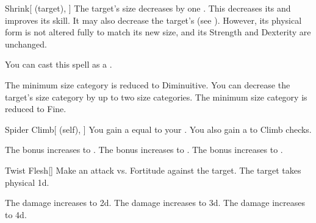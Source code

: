 \lowercase{\hypertarget{spell:Shrink}{}}\label{spell:Shrink}
\begin{attuneability}[Rank 1]{\hypertarget{spell:Shrink}{Shrink}}[ (target), ]
The target's size decreases by one .
This decreases its  and improves its  skill.
It may also decrease the target's  (see ).
However, its physical form is not altered fully to match its new size, and its Strength and Dexterity are unchanged.

You can cast this spell as a .

\rankline
{} The minimum size category is reduced to Diminuitive.
 You can decrease the target's size category by up to two size categories.
 The minimum size category is reduced to Fine.
\end{attuneability}
\vspace{0.25em}



\lowercase{\hypertarget{spell:Spider Climb}{}}\label{spell:Spider Climb}
\begin{attuneability}[Rank 1]{\hypertarget{spell:Spider Climb}{Spider Climb}}[ (self), ]
You gain a  equal to your .
You also gain a   to Climb checks.

\rankline
{} The bonus increases to .
 The bonus increases to .
 The bonus increases to .
\end{attuneability}
\vspace{0.25em}



\lowercase{\hypertarget{spell:Twist Flesh}{}}\label{spell:Twist Flesh}
\begin{freeability}[Rank 1]{\hypertarget{spell:Twist Flesh}{Twist Flesh}}[]
Make an attack vs. Fortitude against the target.
\hit The target takes physical  \plus1d.

\rankline
{} The damage increases to  \plus2d.
 The damage increases to  \plus3d.
 The damage increases to  \plus4d.
\end{freeability}
\vspace{0.25em}



